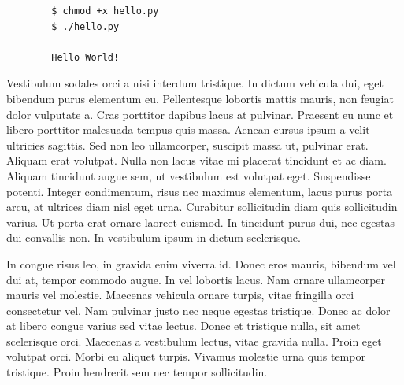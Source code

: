 \documentclass{article}
\begin{document}
\begin{commandline}
	\begin{verbatim}
		$ chmod +x hello.py
		$ ./hello.py

		Hello World!
	\end{verbatim}
\end{commandline}

Vestibulum sodales orci a nisi interdum tristique. In dictum vehicula dui, eget bibendum purus elementum eu. Pellentesque lobortis mattis mauris, non feugiat dolor vulputate a. Cras porttitor dapibus lacus at pulvinar. Praesent eu nunc et libero porttitor malesuada tempus quis massa. Aenean cursus ipsum a velit ultricies sagittis. Sed non leo ullamcorper, suscipit massa ut, pulvinar erat. Aliquam erat volutpat. Nulla non lacus vitae mi placerat tincidunt et ac diam. Aliquam tincidunt augue sem, ut vestibulum est volutpat eget. Suspendisse potenti. Integer condimentum, risus nec maximus elementum, lacus purus porta arcu, at ultrices diam nisl eget urna. Curabitur sollicitudin diam quis sollicitudin varius. Ut porta erat ornare laoreet euismod. In tincidunt purus dui, nec egestas dui convallis non. In vestibulum ipsum in dictum scelerisque.

\begin{warn}[Notice:]
  In congue risus leo, in gravida enim viverra id. Donec eros mauris, bibendum vel dui at, tempor commodo augue. In vel lobortis lacus. Nam ornare ullamcorper mauris vel molestie. Maecenas vehicula ornare turpis, vitae fringilla orci consectetur vel. Nam pulvinar justo nec neque egestas tristique. Donec ac dolor at libero congue varius sed vitae lectus. Donec et tristique nulla, sit amet scelerisque orci. Maecenas a vestibulum lectus, vitae gravida nulla. Proin eget volutpat orci. Morbi eu aliquet turpis. Vivamus molestie urna quis tempor tristique. Proin hendrerit sem nec tempor sollicitudin.
\end{warn}

\end{document}
